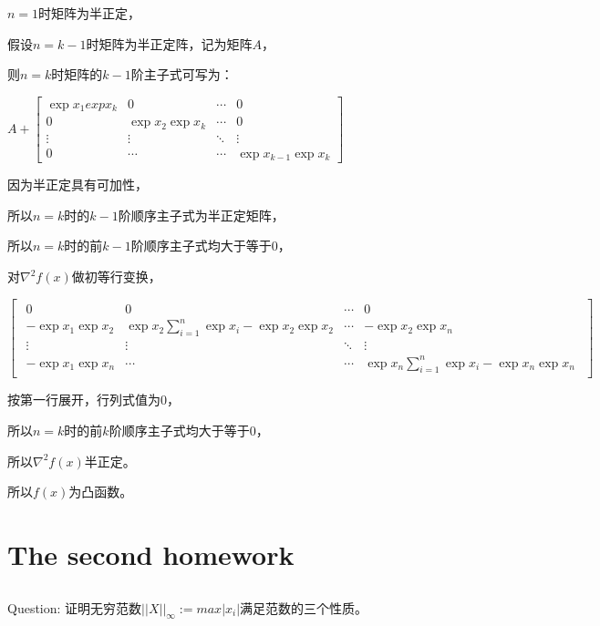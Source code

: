 \documentclass[UTF8]{ctexart}
\begin{document}
$n = 1$时矩阵为半正定，

假设$n = k - 1$时矩阵为半正定阵，记为矩阵$A$，

则$n = k$时矩阵的$k - 1$阶主子式可写为：

\begin{center}
$A + \begin{bmatrix} 
\exp x_1exp x_k  & 0 & \cdots & 0 \\
0 & \exp x_2\exp x_k & \cdots & 0 \\
 \vdots   & \vdots & \ddots  & \vdots  \\
0 &   \cdots &\cdots  &\exp x_{k-1}\exp x_k   
 \end{bmatrix}$
\end{center}

因为半正定具有可加性，

所以$n = k$时的$k - 1$阶顺序主子式为半正定矩阵，

所以$n = k$时的前$k - 1$阶顺序主子式均大于等于$0$，

对$\nabla^2 f(x)$做初等行变换，

\begin{center}
$\begin{bmatrix} \begin{smallmatrix}
0  &  0 & \cdots &0 \\
 -\exp x_1\exp x_2 & \exp x_2\sum_{i=1}^n \exp x_i - \exp x_2\exp x_2 & \cdots & -\exp x_2\exp x_n \\
 \vdots   & \vdots & \ddots  & \vdots  \\
-\exp x_1\exp x_n &   \cdots &\cdots  &\exp x_n\sum_{i=1}^n \exp x_i - \exp x_n\exp x_n    
\end{smallmatrix} \end{bmatrix}$
\end{center}

按第一行展开，行列式值为$0$，

所以$n = k$时的前$k$阶顺序主子式均大于等于$0$，

所以$\nabla^2 f(x)$半正定。

所以$f(x)$为凸函数。

\section{The second homework}
\subsection{}
Question:
证明无穷范数$|\lvert X |\lvert_\infty := max|x_i|$满足范数的三个性质。
\end{document}
